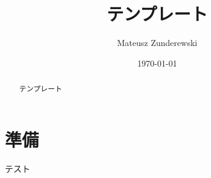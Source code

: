 \documentclass{jlreq}
\title{テンプレート}
\author{Mateusz Zunderewski}
\date{\today}
\begin{document}
\maketitle

\begin{abstract}
	テンプレート
\end{abstract}

\setcounter{tocdepth}{3}
\tableofcontents

\pagebreak

\section{準備}

\begin{definition}
	テスト
\end{definition}


\end{document}
